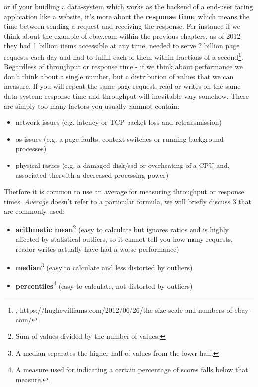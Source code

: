 or if your buidling a data-system which works as the backend of a end-user facing application like a website, it's more about the \textbf{response time}, which means the time between sending a request and receiving the response. For instance if we think about the example of ebay.com within the previous chapters, as of 2012 they had 1 billion items accessible at any time, needed to serve 2 billion page requests each day and had to fulfill each of them within fractions of a second\footnote{\cite{EBAY2012}, https://hughewilliams.com/2012/06/26/the-size-scale-and-numbers-of-ebay-com/}. \\

Regardless of throughput or response time - if we think about performance we don't think about a single number, but a distribution of values that we can measure. If you will repeat the same page request, read or writes on the same data system: response time and throughput will inevitable vary somehow. There are simply too many factors you usually cannnot contain:
\begin{itemize}
			\item network issues (e.g. latency or TCP packet loss and retransmission)
			\item os issues (e.g. a page faults, context switches or running background processes)
			\item physical issues (e.g. a damaged disk/ssd or overheating of a CPU and, associated therwith a decreased processing power) \\
\end{itemize}

Therfore it is common to use an average for measuring throughput or response times. \textit{Average} doesn't refer to a particular formula, we will briefly discuss 3 that are commonly used:
\begin{itemize}
			\item \textbf{arithmetic mean}\footnote{Sum of values divided by the number of values.} (easy to calculate but ignores ratios and is highly affected by statistical outliers, so it cannot tell you how many requests, reador writes actually have had a worse performance)
			\item \textbf{median}\footnote{A median separates the higher half of values from the lower half.} (easy to calculate and less distorted by outliers)
			\item \textbf{percentiles}\footnote{A measure used for indicating a certain percentage of scores falls below that measure.} (easy to calculate, not distorted by outliers) \\
\end{itemize}

